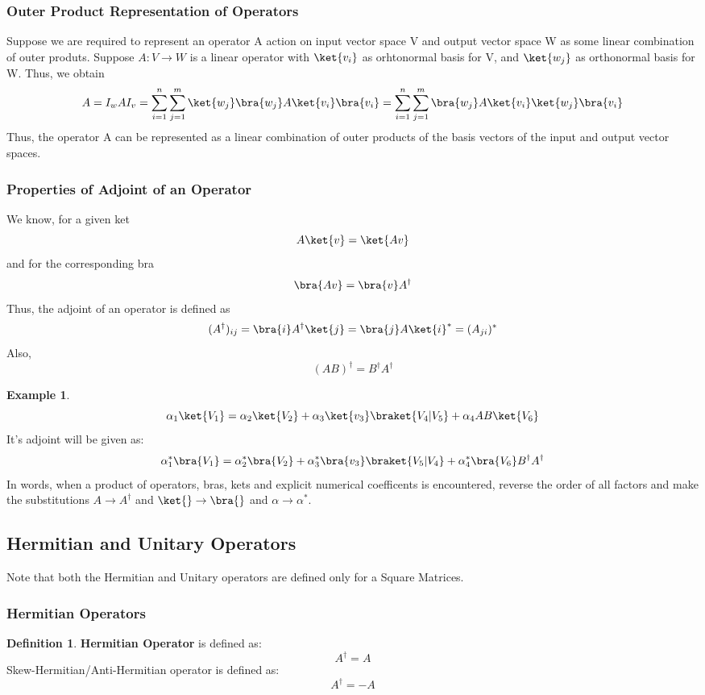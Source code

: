 \documentclass[12pt, oneside]{book}
\theoremstyle{definition}
\newtheorem{definition}{Definition}[section]
\theoremstyle{definition}
\newtheorem{example}{Example}[section]
\theoremstyle{remark}
\begin{document}
\subsubsection{Outer Product Representation of Operators}
Suppose we are required to represent an operator A action on input vector space V and output vector space W as some linear 
combination of outer produts. Suppose $A:V\rightarrow W$ is a linear operator with $\ket{v_i}$ as orhtonormal basis for V, and $\ket{w_j}$ as
orthonormal basis for W. Thus, we obtain
\[ A = I_w A I_v = \sum_{i=1}^n \sum_{j=1}^m \ket{w_j}\bra{w_j}A\ket{v_i}\bra{v_i}=\sum_{i=1}^n \sum_{j=1}^m \bra{w_j}A\ket{v_i} \ket{w_j}\bra{v_i} \]
Thus, the operator A can be represented as a linear combination of outer products of the basis vectors of the input and output vector spaces.

\subsubsection{Properties of Adjoint of an Operator}
We know, for a given ket
\[A\ket{v}=\ket{Av}\]
and for the corresponding bra
\[\bra{Av}=\bra{v}A^{\dagger}\]
Thus, the adjoint of an operator is defined as
\[ (A^{\dagger})_{ij}=\bra{i}A^{\dagger}\ket{j}=\bra{j}A\ket{i}^*=(A_{ji})^* \]
Also,
\[ (AB)^{\dagger}=B^{\dagger}A^{\dagger} \]
\begin{example}
    \[\alpha_1\ket{V_1}=\alpha_2\ket{V_2}+\alpha_3\ket{v_3}\braket{V_4|V_5} + \alpha_4AB\ket{V_6}\]
    It's adjoint will be given as:
    \[\alpha_1^*\bra{V_1}=\alpha_2^*\bra{V_2}+\alpha_3^*\bra{v_3}\braket{V_5|V_4} + \alpha_4^*\bra{V_6}B^{\dagger}A^{\dagger}\]
    In words, when a product of operators, bras, kets and explicit numerical coefficents is encountered, reverse the order of all factors 
    and make the substitutions $A \rightarrow A^{\dagger}$ and $\ket{} \rightarrow \bra{}$ and $\alpha \rightarrow \alpha^*$.
\end{example}

\subsection{Hermitian and Unitary Operators}
Note that both the Hermitian and Unitary operators are defined only for a Square Matrices.

\subsubsection{Hermitian Operators}
\begin{definition}
\textbf{Hermitian Operator} is defined as:
\[A^{\dagger}=A\]
Skew-Hermitian/Anti-Hermitian operator is defined as:
\[A^{\dagger}=-A\]
\end{definition}
\end{document}
